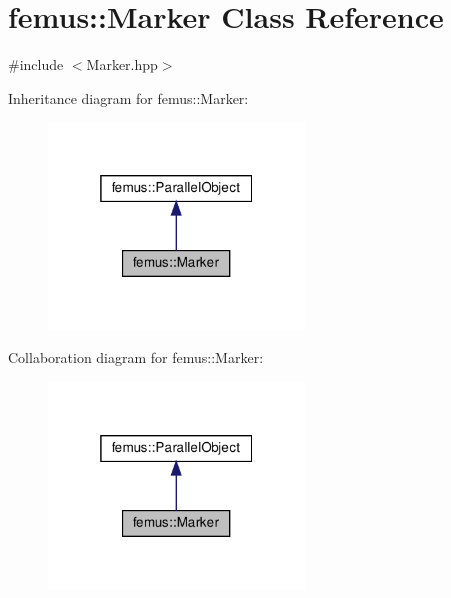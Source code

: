\hypertarget{classfemus_1_1_marker}{}\section{femus\+:\+:Marker Class Reference}
\label{classfemus_1_1_marker}


{\ttfamily \#include $<$Marker.\+hpp$>$}



Inheritance diagram for femus\+:\+:Marker\+:
\nopagebreak
\begin{figure}[H]
\begin{center}
\leavevmode
\includegraphics[width=193pt]{classfemus_1_1_marker__inherit__graph}
\end{center}
\end{figure}


Collaboration diagram for femus\+:\+:Marker\+:
\nopagebreak
\begin{figure}[H]
\begin{center}
\leavevmode
\includegraphics[width=193pt]{classfemus_1_1_marker__coll__graph}
\end{center}
\end{figure}
